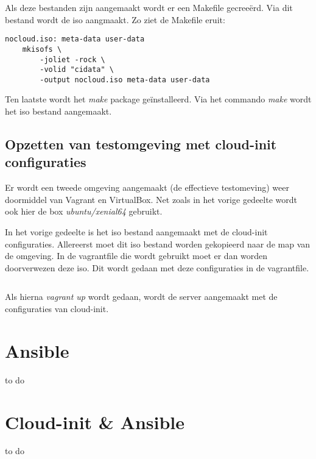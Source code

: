 Als deze bestanden zijn aangemaakt wordt er een Makefile gecreeërd. Via dit bestand wordt de iso aangmaakt. Zo ziet de Makefile eruit:
\begin{lstlisting}
nocloud.iso: meta-data user-data
    mkisofs \
        -joliet -rock \
        -volid "cidata" \
        -output nocloud.iso meta-data user-data
\end{lstlisting}

Ten laatste wordt het \textit{make} package geïnstalleerd. Via het commando \textit{make} wordt het iso bestand aangemaakt.

\subsection{Opzetten van testomgeving met cloud-init configuraties}
Er wordt een tweede omgeving aangemaakt (de effectieve testomeving) weer doormiddel van Vagrant en VirtualBox. Net zoals in het vorige gedeelte wordt ook hier de box \textit{ubuntu/xenial64} gebruikt.

In het vorige gedeelte is het iso bestand aangemaakt met de cloud-init configuraties. Allereerst moet dit iso bestand worden gekopieerd naar de map van de omgeving. In de vagrantfile die wordt gebruikt moet er dan worden doorverwezen deze iso. Dit wordt gedaan met deze configuraties in de vagrantfile.
\begin{lstlisting}

\end{lstlisting}
Als hierna \textit{vagrant up} wordt gedaan, wordt de server aangemaakt met de configuraties van cloud-init.
 
\section{Ansible}
to do

\section{Cloud-init \& Ansible }
to do